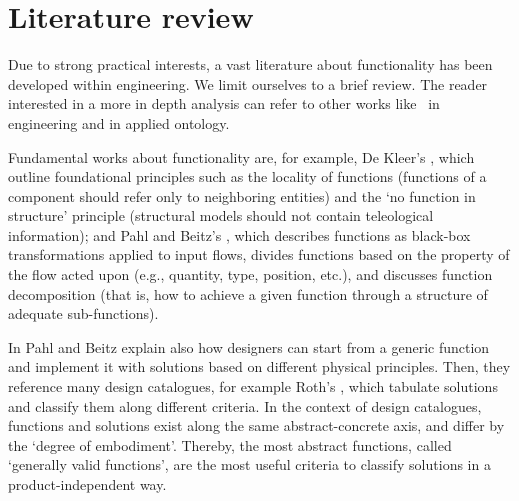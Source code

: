 \documentclass[sw]{iosart2x}
\newcommand{\quotes}[1]{`#1'}
\begin{document}
\section{Literature review\label{sec:review}} %
Due to strong practical interests, a vast literature about functionality has been developed within engineering. 
We limit ourselves to a brief review. The reader interested in a more in depth analysis can refer to other works like~\cite{erdenReviewFunctionModeling2008} in engineering and \cite{artigaNewPerspectiveOnFunctions} in applied ontology.

Fundamental works about functionality are, for example, De Kleer's \cite{de_kleer_how_1984, kleer_qualitative_1984}, which outline foundational principles such as the locality of functions (functions of a component should refer only to neighboring entities) and the \quotes{no function in structure} principle (structural models should not contain teleological information); and Pahl and Beitz's \cite{pahl_engineering_2007}, which describes functions as black-box transformations applied to input flows, divides functions based on the property of the flow acted upon (e.g., quantity, type, position, etc.), and discusses function decomposition (that is, how to achieve a given function through a structure of adequate sub-functions).

In \cite{pahl_engineering_2007} Pahl and Beitz explain also how designers can start from a generic function and implement it with solutions based on different physical principles. 
Then, they reference many design catalogues, for example Roth's \cite{rothKonstruierenMitKonstruktionskatalogen2000}, which tabulate solutions and classify them along different criteria.
In the context of design catalogues, functions and solutions exist along the same abstract-concrete axis, and differ by the \quotes{degree of embodiment}. 
Thereby, the most abstract functions, called \quotes{generally valid functions}, are the most useful criteria to classify solutions in a product-independent way. 
\end{document}
